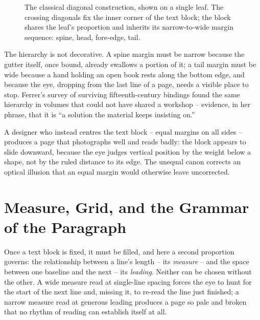 \documentclass[11pt,paper=a4,footinclude=true,headinclude=true,open=any]{scrbook}
\begin{document}
\begin{figure}[h]
\centering
{}
\caption{The classical diagonal construction, shown on a single leaf. The crossing diagonals fix the inner corner of the text block; the block shares the leaf's proportion and inherits its narrow-to-wide margin sequence: spine, head, fore-edge, tail.}
\label{fig:canon}
\end{figure}

The hierarchy is not decorative. A spine margin must be narrow because the gutter itself, once bound, already swallows a portion of it; a tail margin must be wide because a hand holding an open book rests along the bottom edge, and because the eye, dropping from the last line of a page, needs a visible place to stop. Ferrer's survey of surviving fifteenth-century bindings found the same hierarchy in volumes that could not have shared a workshop -- evidence, in her phrase, that it is ``a solution the material keeps insisting on.''

A designer who instead centres the text block -- equal margins on all sides -- produces a page that photographs well and reads badly: the block appears to slide downward, because the eye judges vertical position by the weight below a shape, not by the ruled distance to its edge. The unequal canon corrects an optical illusion that an equal margin would otherwise leave uncorrected.

\section{Measure, Grid, and the Grammar of the Paragraph}
\label{sec:measure}

Once a text block is fixed, it must be filled, and here a second proportion governs: the relationship between a line's length -- its \emph{measure} -- and the space between one baseline and the next -- its \emph{leading}. Neither can be chosen without the other. A wide measure read at single-line spacing forces the eye to hunt for the start of the next line and, missing it, to re-read the line just finished; a narrow measure read at generous leading produces a page so pale and broken that no rhythm of reading can establish itself at all.
\end{document}
